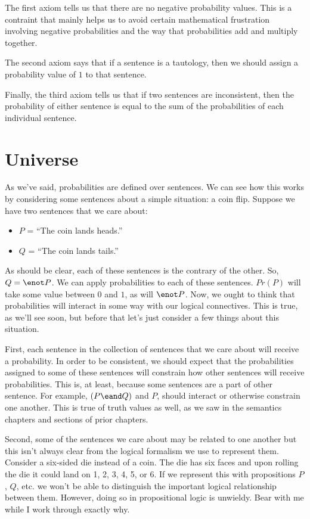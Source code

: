 The first axiom tells us that there are no negative probability values. This is a contraint that mainly helps us to avoid certain mathematical frustration involving negative probabilities and the way that probabilities add and multiply together.

The second axiom says that if a sentence is a tautology, then we should assign a probability value of $1$ to that sentence.

Finally, the third axiom tells us that if two sentences are inconsistent, then the probability of either sentence is equal to the sum of the probabilities of each individual sentence.

\section{Universe}

As we've said, probabilities are defined over sentences. We can see how this works by considering some sentences about a simple situation: a coin flip. Suppose we have two sentences that we care about:
\begin{itemize}
  \item $P$ = ``The coin lands heads.''
  \item $Q$ = ``The coin lands tails.''
\end{itemize}
As should be clear, each of these sentences is the contrary of the other. So, $Q=\enot P$. We can apply probabilities to each of these sentences. $Pr(P)$ will take some value between $0$ and $1$, as will $\enot P$. Now, we ought to think that probabilities will interact in some way with our logical connectives. This is true, as we'll see soon, but before that let's just consider a few things about this situation.

First, each sentence in the collection of sentences that we care about will receive a probability. In order to be consistent, we should expect that the probabilities assigned to some of these sentences will constrain how other sentences will receive probabilities. This is, at least, because some sentences are a part of other sentence. For example, $(P\eand Q)$ and $P$, should interact or otherwise constrain one another. This is true of truth values as well, as we saw in the semantics chapters and sections of prior chapters.

Second, some of the sentences we care about may be related to one another but this isn't always clear from the logical formalism we use to represent them. Consider a six-sided die instead of a coin. The die has six faces and upon rolling the die it could land on 1, 2, 3, 4, 5, or 6. If we represent this with propositions $P$, $Q$, etc. we won't be able to distinguish the important logical relationship between them. However, doing so in propositional logic is unwieldy. Bear with me while I work through exactly why.

